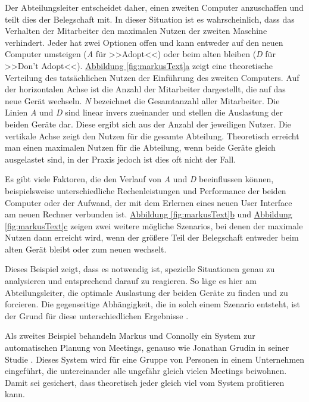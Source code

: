 	Der Abteilungsleiter entscheidet daher, einen zweiten Computer anzuschaffen und teilt dies der Belegschaft mit. In dieser Situation ist es wahrscheinlich, dass das Verhalten der Mitarbeiter den maximalen Nutzen der zweiten Maschine verhindert. Jeder hat zwei Optionen offen und kann entweder auf den neuen Computer umsteigen (\emph{A} für >>Adopt<<) oder beim alten bleiben (\emph{D} für >>Don't Adopt<<). \hyperref[fig:markusText]{Abbildung \ref*{fig:markusText}a} zeigt eine theoretische Verteilung des tatsächlichen Nutzen der Einführung des zweiten Computers. Auf der horizontalen Achse ist die Anzahl der Mitarbeiter dargestellt, die auf das neue Gerät wechseln. \emph{N} bezeichnet die Gesamtanzahl aller Mitarbeiter. Die Linien \emph{A} und \emph{D} sind linear invers zueinander und stellen die Auslastung der beiden Geräte dar. Diese ergibt sich aus der Anzahl der jeweiligen Nutzer. Die vertikale Achse zeigt den Nutzen für die gesamte Abteilung. Theoretisch erreicht man einen maximalen Nutzen für die Abteilung, wenn beide Geräte gleich ausgelastet sind, in der Praxis jedoch ist dies oft nicht der Fall.
	
	\medskip Es gibt viele Faktoren, die den Verlauf von \emph{A} und \emph{D} beeinflussen können, beispielsweise unterschiedliche Rechenleistungen und Performance der beiden Computer oder der Aufwand, der mit dem Erlernen eines neuen User Interface am neuen Rechner verbunden ist. \hyperref[fig:markusText]{Abbildung \ref*{fig:markusText}b} und \hyperref[fig:markusText]{Abbildung \ref*{fig:markusText}c} zeigen zwei weitere mögliche Szenarios, bei denen der maximale Nutzen dann erreicht wird, wenn der größere Teil der Belegschaft entweder beim alten Gerät bleibt oder zum neuen wechselt.
	
	Dieses Beispiel zeigt, dass es notwendig ist, spezielle Situationen genau zu analysieren und entsprechend darauf zu reagieren. So läge es hier am Abteilungsleiter, die optimale Auslastung der beiden Geräte zu finden und zu forcieren. Die gegenseitige Abhängigkeit, die in solch einem Szenario entsteht, ist der Grund für diese unterschiedlichen Ergebnisse \citep{Markus:1990}.
	
	\medskip Als zweites Beispiel behandeln Markus und Connolly ein System zur automatischen Planung von Meetings, genauso wie Jonathan Grudin in seiner Studie \citep{Grudin:1988p126}. Dieses System wird für eine Gruppe von Personen in einem Unternehmen eingeführt, die untereinander alle ungefähr gleich vielen Meetings beiwohnen. Damit sei gesichert, dass theoretisch jeder gleich viel vom System profitieren kann. 
	
